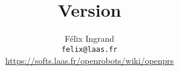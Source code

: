 \documentclass[twoside,openright]{book}
\begin{document}
\title{
        \COPRSDE{} \\
         Version \oprsdocversion{}}

\author{F\'{e}lix Ingrand\\
        \texttt{felix@laas.fr}\\
        \url{https://softs.laas.fr/openrobots/wiki/openprs}
}

\maketitle

\clearpage


\clearpage
\pagestyle{headings}

\tableofcontents
\listoffigures
\listoftables

\cleardoublepage
{}













\end{document}

